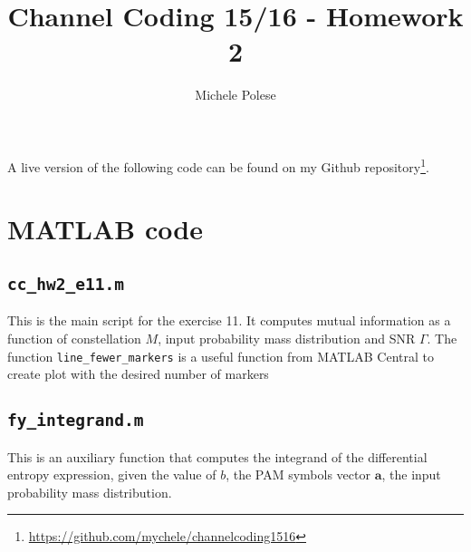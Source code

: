\documentclass[10pt]{article}
\numberwithin{equation}{section}
\begin{document}
\title{Channel Coding 15/16 - Homework 2}
\author{Michele Polese}

\maketitle

A live version of the following code can be found on my Github repository\footnote{\url{https://github.com/mychele/channelcoding1516}}.

\section*{MATLAB code}

\subsection*{\texttt{cc\_hw2\_e11.m}}
This is the main script for the exercise 11. It computes mutual information as a function of constellation $M$, input probability mass distribution and SNR $\Gamma$. The function \texttt{line\_fewer\_markers} is a useful function from MATLAB Central to create plot with the desired number of markers


\subsection*{\texttt{fy\_integrand.m}} 
This is an auxiliary function that computes the integrand of the differential entropy expression, given the value of $b$, the PAM symbols vector $\mathbf{a}$, the input probability mass distribution.

\end{document}
